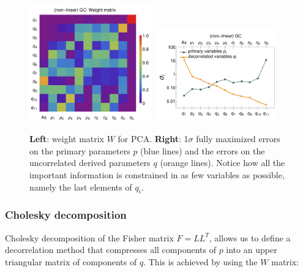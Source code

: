 \begin{figure}[htbp]
	\centering
	\includegraphics[width=0.47\textwidth]{Chapters/linear-nonlinear-MG-forecasts/figures/Decorrelations-GC/Weight_Matrix_PCA_SquareNorm--_fiducialMGBin3_Euclid_GC_nonlinearPk__Zhao_.pdf}
	\includegraphics[width=0.47\textwidth]{Chapters/linear-nonlinear-MG-forecasts/figures/Decorrelations-GC/Errors_at_par_index_i--_PCA_SquareNorm--fiducialMGBin3_Euclid_GC_nonlinearPk__Zhao_.pdf}
	\caption[PCA decorrelation: Weight matrix and uncorrelated errors.]{\textbf{Left}: weight matrix $W$ for PCA. \textbf{Right}: 1$\sigma$ fully maximized errors on
		the primary parameters $p$ (blue lines) and the errors on the uncorrelated
		derived parameters $q$ (orange lines). Notice how all the important information is constrained in as few variables as possible,
		namely the last elements of $q_i$.
	}\label{fig:PCA-GCnlhs}
\end{figure}


\subsubsection{Cholesky decomposition}

Cholesky decomposition of the Fisher matrix $F=LL^{T}$, allows us to
define a decorrelation method that compresses
all components of $p$ into an upper triangular matrix of components
of $q$. This is achieved by using the $W$ matrix:

